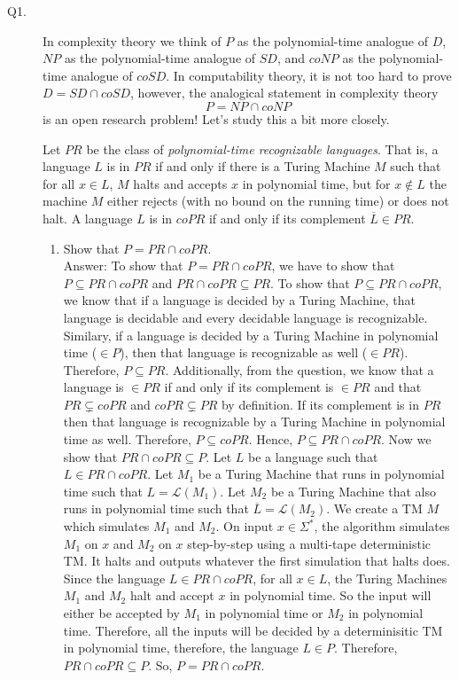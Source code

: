 \documentclass{csc_assignment}
\begin{document}
\begin{description}

\newpage
\item[Q1.]
 In complexity theory we think of $P$ as the polynomial-time analogue of $D$, $NP$ as the polynomial-time analogue of $SD$, and $coNP$ as the polynomial-time analogue of $coSD$.
  In computability theory, it is not too hard to prove $D = SD \cap coSD$, however, the analogical statement in complexity theory \[P = NP \cap coNP\] is an open research problem!
  Let's study this a bit more closely.
  
  Let $PR$ be the class of \emph{polynomial-time recognizable languages}.
  That is, a language $L$ is in $PR$ if and only if there is a Turing Machine $M$ such that for all $x \in L$, $M$ halts and accepts $x$ in polynomial time, but for $x \not \in L$ the machine $M$ either rejects (with no bound on the running time) or does not halt.
  A language $L$ is in $coPR$ if and only if its complement $\overline L \in PR$.
  
  \begin{enumerate}
  \item Show that $P = PR \cap coPR$.\\
  Answer: To show that $P = PR \cap coPR$, we have to show that $P \subseteq PR \cap coPR$ and $PR \cap coPR \subseteq PR$. To show that $P \subseteq PR \cap coPR$, we know that if a language is decided by a Turing Machine, that language is decidable and every decidable language is recognizable. Similary, if a language is decided by a Turing Machine in polynomial time ($\in P$), then that language is recognizable as well ($\in PR$). Therefore, $P \subseteq PR$. Additionally, from the question, we know that a language is $\in PR$ if and only if its complement is $\in PR$ and that $PR \subsetneq coPR$ and $coPR \subsetneq PR$ by definition. If its complement is in $PR$ then that language is recognizable by a Turing Machine in polynomial time as well. Therefore, $P \subseteq coPR$. Hence, $P \subseteq PR \cap coPR$. Now we show that $PR \cap coPR \subseteq P$. Let $L$ be a language such that $L \in PR \cap coPR$. Let $M_{1}$ be a Turing Machine that runs in polynomial time such that $L = \mathcal{L}(M_{1})$. Let $M_{2}$ be a Turing Machine that also runs in polynomial time such that $\overline L = \mathcal{L}(M_{2})$. We create a TM $M$ which simulates $M_{1}$ and $M_{2}$. On input $x \in \Sigma^{*}$, the algorithm simulates $M_{1}$ on $x$ and $M_{2}$ on $x$ step-by-step using a multi-tape deterministic TM. It halts and outputs whatever the first simulation that halts does. Since the language $L \in PR \cap coPR$, for all $x \in L$, the Turing Machines $M_{1}$ and $M_{2}$ halt and accept $x$ in polynomial time. So the input will either be accepted by $M_{1}$ in polynomial time or $M_{2}$ in polynomial time. Therefore, all the inputs will be decided by a determinisitic TM in polynomial time, therefore, the language $L \in P$. Therefore, $PR \cap coPR \subseteq P$. So, $P = PR \cap coPR$.



\end{enumerate}
\end{description}
\end{document}
